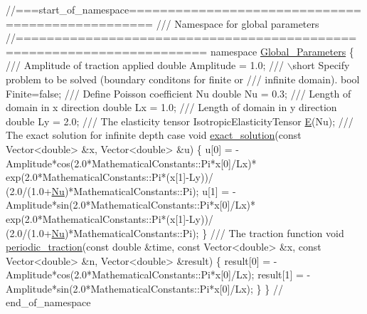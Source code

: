  
\begin{DoxyCodeInclude}
\textcolor{comment}{//===start\_of\_namespace=================================================}
\textcolor{comment}{/// Namespace for global parameters}
\textcolor{comment}{}\textcolor{comment}{//======================================================================}
\textcolor{keyword}{namespace }\hyperlink{namespaceGlobal__Parameters}{Global\_Parameters}
\{\textcolor{comment}{}
\textcolor{comment}{ /// Amplitude of traction applied}
\textcolor{comment}{} \textcolor{keywordtype}{double} Amplitude = 1.0;
\textcolor{comment}{}
\textcolor{comment}{ /// \(\backslash\)short Specify problem to be solved (boundary conditons for finite or}
\textcolor{comment}{ /// infinite domain).}
\textcolor{comment}{} \textcolor{keywordtype}{bool} Finite=\textcolor{keyword}{false};
\textcolor{comment}{}
\textcolor{comment}{ /// Define Poisson coefficient Nu}
\textcolor{comment}{} \textcolor{keywordtype}{double} Nu = 0.3;
\textcolor{comment}{}
\textcolor{comment}{ /// Length of domain in x direction}
\textcolor{comment}{} \textcolor{keywordtype}{double} Lx = 1.0;
\textcolor{comment}{}
\textcolor{comment}{ /// Length of domain in y direction}
\textcolor{comment}{} \textcolor{keywordtype}{double} Ly = 2.0;
\textcolor{comment}{}
\textcolor{comment}{ /// The elasticity tensor}
\textcolor{comment}{} IsotropicElasticityTensor \hyperlink{namespaceGlobal__Parameters_a397f48e074d2589259ed5c6e4d89f948}{E}(Nu);
\textcolor{comment}{}
\textcolor{comment}{ /// The exact solution for infinite depth case}
\textcolor{comment}{} \textcolor{keywordtype}{void} \hyperlink{namespaceGlobal__Parameters_a6e53a9e4370e8719e9091eff6b6a0c01}{exact\_solution}(\textcolor{keyword}{const} Vector<double> &x,
                     Vector<double> &u)
 \{
  u[0] = -Amplitude*cos(2.0*MathematicalConstants::Pi*x[0]/Lx)*
        exp(2.0*MathematicalConstants::Pi*(x[1]-Ly))/
        (2.0/(1.0+\hyperlink{namespaceGlobal__Parameters_a20fccdcfa2c15ad8b951b9ada3bb1661}{Nu})*MathematicalConstants::Pi);
  u[1] = -Amplitude*sin(2.0*MathematicalConstants::Pi*x[0]/Lx)*
        exp(2.0*MathematicalConstants::Pi*(x[1]-Ly))/
        (2.0/(1.0+\hyperlink{namespaceGlobal__Parameters_a20fccdcfa2c15ad8b951b9ada3bb1661}{Nu})*MathematicalConstants::Pi);
 \}
\textcolor{comment}{}
\textcolor{comment}{ /// The traction function}
\textcolor{comment}{}\textcolor{keywordtype}{void} \hyperlink{namespaceGlobal__Parameters_a003c4c942a4c8b88b417f139fc5c637c}{periodic\_traction}(\textcolor{keyword}{const} \textcolor{keywordtype}{double} &time,
                       \textcolor{keyword}{const} Vector<double> &x,
                       \textcolor{keyword}{const} Vector<double> &n,
                       Vector<double> &result)
 \{
  result[0] = -Amplitude*cos(2.0*MathematicalConstants::Pi*x[0]/Lx);
  result[1] = -Amplitude*sin(2.0*MathematicalConstants::Pi*x[0]/Lx);
 \}
\} \textcolor{comment}{// end\_of\_namespace}

\end{DoxyCodeInclude}




